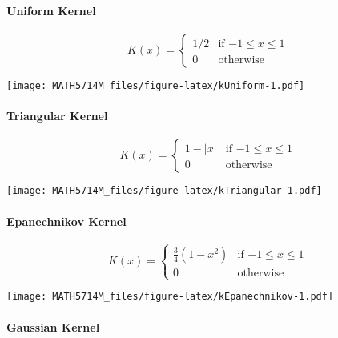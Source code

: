 \documentclass[
  a4paper,
]{article}
\theoremstyle{definition}
\theoremstyle{definition}
\theoremstyle{definition}
\theoremstyle{definition}
\theoremstyle{remark}
\begin{document}
\hypertarget{uniform-kernel}{%
\paragraph{Uniform Kernel}\label{uniform-kernel}}

\begin{equation*}
  K(x)
  = \begin{cases}
      1/2 & \mbox{if $-1 \leq x \leq 1$} \\
      0 & \mbox{otherwise}
    \end{cases}
\end{equation*}

\texttt{[image: MATH5714M\_files/figure-latex/kUniform-1.pdf]}

\hypertarget{triangular}{%
\paragraph{Triangular Kernel}\label{triangular}}

\begin{equation*}
  K(x)
  = \begin{cases}
      1-|x| & \mbox{if $-1 \leq x \leq 1$} \\
      0 & \mbox{otherwise}
    \end{cases}
\end{equation*}

\texttt{[image: MATH5714M\_files/figure-latex/kTriangular-1.pdf]}

\hypertarget{epanechnikov-kernel}{%
\paragraph{Epanechnikov Kernel}\label{epanechnikov-kernel}}

\begin{equation*}
  K(x)
  = \begin{cases}
      \frac34 (1-x^2) & \mbox{if $-1 \leq x \leq 1$} \\
      0 & \mbox{otherwise}
    \end{cases}
\end{equation*}

\texttt{[image: MATH5714M\_files/figure-latex/kEpanechnikov-1.pdf]}

\hypertarget{gaussian-kernel}{%
\paragraph{Gaussian Kernel}\label{gaussian-kernel}}
\end{document}
